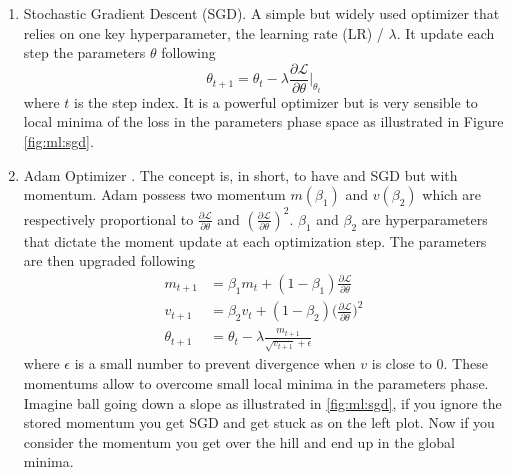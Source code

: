 \documentclass[../main.tex]{subfiles}
\begin{document}
\begin{enumerate}
  \item Stochastic Gradient Descent (SGD).
    A simple but widely used optimizer that relies on one key hyperparameter, the learning rate (LR) / $\lambda$. It update each step the parameters $\theta$ following
    \begin{equation}
      \theta_{t+1} = \theta_t - \lambda \frac{\partial \mathcal{L}}{\partial \theta}\bigg|_{\theta_t}
    \end{equation}
    where $t$ is the step index. It is a powerful optimizer but is very sensible to local minima of the loss in the parameters phase space as illustrated in Figure \ref{fig:ml:sgd}.

  \item Adam Optimizer \cite{kingma_adam_2017}. The concept is, in short, to have and SGD but with momentum. Adam possess two momentum $m(\beta_1)$ and $v(\beta_2)$ which are respectively proportional to $\frac{\partial \mathcal{L}}{\partial \theta}$ and $(\frac{\partial \mathcal{L}}{\partial \theta})^2$. $\beta_1$ and $\beta_2$ are hyperparameters that dictate the moment update at each optimization step. The parameters are then upgraded following \begin{align}
      m_{t+1} &= \beta_1 m_t + (1 - \beta_1) \frac{\partial \mathcal{L}}{\partial \theta} \\
      v_{t+1} &= \beta_2 v_t + (1 - \beta_2) \bigg(\frac{\partial \mathcal{L}}{\partial \theta}\bigg)^2 \\
      \theta_{t+1} &= \theta_{t} - \lambda \frac{m_{t+1}}{\sqrt{v_{t+1}} + \epsilon}
    \end{align}
    where $\epsilon$ is a small number to prevent divergence when $v$ is close to 0. These momentums allow to overcome small local minima in the parameters phase. Imagine ball going down a slope as illustrated in \ref{fig:ml:sgd}, if you ignore the stored momentum you get SGD and get stuck as on the left plot. Now if you consider the momentum you get over the hill and end up in the global minima.
\end{enumerate}
\end{document}
